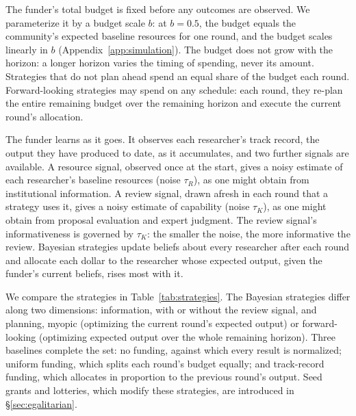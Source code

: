 \documentclass[article, 11pt, reqno]{amsart}
\theoremstyle{named}
\begin{document}
The funder's total budget is fixed before any outcomes are observed. We parameterize it by a budget scale $b$: at $b = 0.5$, the budget equals the community's expected baseline resources for one round, and the budget scales linearly in $b$ (Appendix~\ref{app:simulation}). The budget does not grow with the horizon: a longer horizon varies the timing of spending, never its amount. Strategies that do not plan ahead spend an equal share of the budget each round. Forward-looking strategies may spend on any schedule: each round, they re-plan the entire remaining budget over the remaining horizon and execute the current round's allocation.

The funder learns as it goes. It observes each researcher's track record, the output they have produced to date, as it accumulates, and two further signals are available. A resource signal, observed once at the start, gives a noisy estimate of each researcher's baseline resources (noise $\tau_R$), as one might obtain from institutional information. A review signal, drawn afresh in each round that a strategy uses it, gives a noisy estimate of capability (noise $\tau_K$), as one might obtain from proposal evaluation and expert judgment. The review signal's informativeness is governed by $\tau_K$: the smaller the noise, the more informative the review. Bayesian strategies update beliefs about every researcher after each round and allocate each dollar to the researcher whose expected output, given the funder's current beliefs, rises most with it.

We compare the strategies in Table~\ref{tab:strategies}. The Bayesian strategies differ along two dimensions: information, with or without the review signal, and planning, myopic (optimizing the current round's expected output) or forward-looking (optimizing expected output over the whole remaining horizon). Three baselines complete the set: no funding, against which every result is normalized; uniform funding, which splits each round's budget equally; and track-record funding, which allocates in proportion to the previous round's output. Seed grants and lotteries, which modify these strategies, are introduced in \S\ref{sec:egalitarian}.
\end{document}

